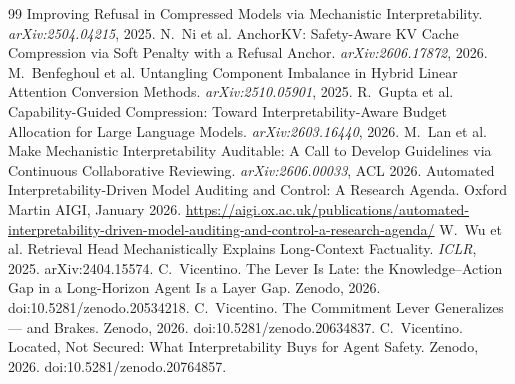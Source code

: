\documentclass[11pt]{article}
\begin{document}
\begin{thebibliography}{99}
Improving Refusal in Compressed Models via Mechanistic Interpretability. \emph{arXiv:2504.04215}, 2025.
 N.~Ni et al. AnchorKV: Safety-Aware KV Cache Compression via
Soft Penalty with a Refusal Anchor. \emph{arXiv:2606.17872}, 2026.
 M.~Benfeghoul et al. Untangling Component Imbalance
in Hybrid Linear Attention Conversion Methods. \emph{arXiv:2510.05901}, 2025.
 R.~Gupta et al. Capability-Guided Compression: Toward
Interpretability-Aware Budget Allocation for Large Language Models. \emph{arXiv:2603.16440}, 2026.
 M.~Lan et al. Make Mechanistic Interpretability Auditable: A Call
to Develop Guidelines via Continuous Collaborative Reviewing. \emph{arXiv:2606.00033}, ACL 2026.
 Automated Interpretability-Driven Model Auditing and
Control: A Research Agenda. Oxford Martin AIGI, January 2026.
\url{https://aigi.ox.ac.uk/publications/automated-interpretability-driven-model-auditing-and-control-a-research-agenda/}
 W.~Wu et al. Retrieval Head Mechanistically Explains
Long-Context Factuality. \emph{ICLR}, 2025. arXiv:2404.15574.
 C.~Vicentino. The Lever Is Late: the Knowledge--Action Gap
in a Long-Horizon Agent Is a Layer Gap. Zenodo, 2026. doi:10.5281/zenodo.20534218.
 C.~Vicentino. The Commitment Lever Generalizes --- and
Brakes. Zenodo, 2026. doi:10.5281/zenodo.20634837.
 C.~Vicentino. Located, Not Secured: What Interpretability
Buys for Agent Safety. Zenodo, 2026. doi:10.5281/zenodo.20764857.
\end{thebibliography}
\end{document}
